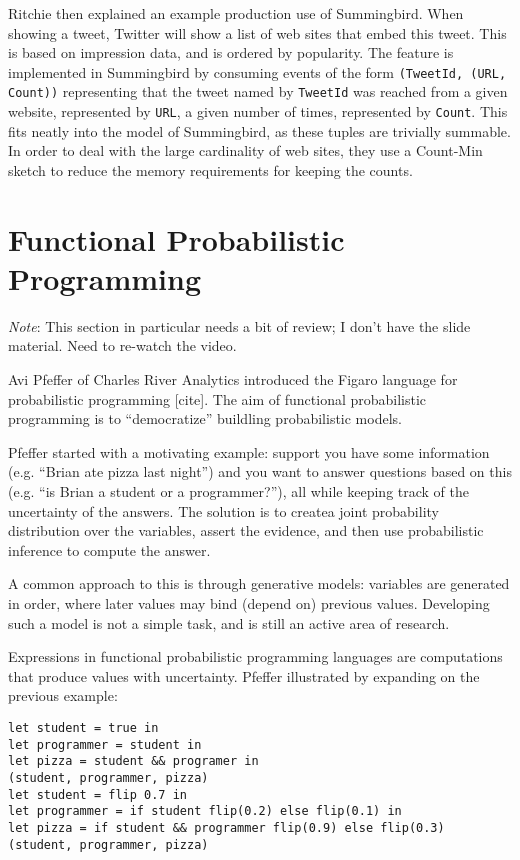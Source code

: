 \documentclass{jfp1}
\newenvironment{ipar}[0]%
 {\begin{list}{}%
 {\setlength{\leftmargin}{1cm}}%
\item[]%
 }
 {\end{list}}
\newcommand\needcite{{\color{red} [cite]}\xspace}
\newcommand{\note}[1]{ \begin{ipar}  {\color{Gray} \textit{Note}: #1} \end{ipar}}
\begin{document}
Ritchie then explained an example production use of Summingbird. When
showing a tweet, Twitter will show a list of web sites that embed this
tweet. This is based on impression data, and is ordered by popularity.
The feature is implemented in Summingbird by consuming events of
the form \texttt{(TweetId, (URL, Count))} representing that
the tweet named by \texttt{TweetId} was reached from a given website,
represented by \texttt{URL}, a given number of times, represented by 
\texttt{Count}. This fits neatly into the model of Summingbird, as
these tuples are trivially summable. In order to deal with the large
cardinality of web sites, they use a Count-Min sketch to 
reduce the memory requirements for keeping the counts.

\section{Functional Probabilistic Programming}


\note{This section in particular needs a bit of review; I don't have the
slide material. Need to re-watch the video.}

Avi Pfeffer of Charles River Analytics introduced the Figaro language
for probabilistic programming\needcite. The aim of functional
probabilistic programming is to ``democratize'' buildling
probabilistic models.

Pfeffer started with a motivating example: support you have some
information (e.g. ``Brian ate pizza last night'') and you want to
answer questions based on this (e.g. ``is Brian a student or a
programmer?''), all while keeping track of the uncertainty of the
answers. The solution is to createa joint probability distribution
over the variables, assert the evidence, and then use probabilistic
inference to compute the answer.

A common approach to this is through generative models: variables are
generated in order, where later values may bind (depend on) previous
values. Developing such a model is not a simple task, and is still an
active area of research.

Expressions in functional probabilistic programming languages are
computations that produce values with uncertainty. Pfeffer illustrated
by expanding on the previous example:

\begin{verbatim}
let student = true in
let programmer = student in
let pizza = student && programer in
(student, programmer, pizza)
let student = flip 0.7 in
let programmer = if student flip(0.2) else flip(0.1) in
let pizza = if student && programmer flip(0.9) else flip(0.3)
(student, programmer, pizza)
\end{verbatim}
\end{document}

